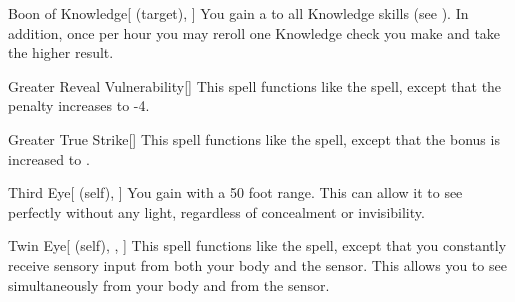 \lowercase{\hypertarget{spell:Boon of Knowledge}{}}\label{spell:Boon of Knowledge}
\begin{attuneability}[Rank 4]{\hypertarget{spell:Boon of Knowledge}{Boon of Knowledge}}[ (target), ]
You gain a   to all Knowledge skills (see ).
In addition, once per hour you may reroll one Knowledge check you make and take the higher result.
\end{attuneability}
\vspace{0.25em}



\lowercase{\hypertarget{spell:Greater Reveal Vulnerability}{}}\label{spell:Greater Reveal Vulnerability}
\begin{freeability}[Rank 4]{\hypertarget{spell:Greater Reveal Vulnerability}{Greater Reveal Vulnerability}}[]
This spell functions like the  spell, except that the penalty increases to -4.
\end{freeability}
\vspace{0.25em}



\lowercase{\hypertarget{spell:Greater True Strike}{}}\label{spell:Greater True Strike}
\begin{freeability}[Rank 4]{\hypertarget{spell:Greater True Strike}{Greater True Strike}}[]
This spell functions like the  spell, except that the bonus is increased to .
\end{freeability}
\vspace{0.25em}



\lowercase{\hypertarget{spell:Third Eye}{}}\label{spell:Third Eye}
\begin{attuneability}[Rank 4]{\hypertarget{spell:Third Eye}{Third Eye}}[ (self), ]
You gain  with a 50 foot range.
This can allow it to see perfectly without any light, regardless of concealment or invisibility.
\end{attuneability}
\vspace{0.25em}



\lowercase{\hypertarget{spell:Twin Eye}{}}\label{spell:Twin Eye}
\begin{attuneability}[Rank 4]{\hypertarget{spell:Twin Eye}{Twin Eye}}[ (self), , ]
This spell functions like the  spell, except that you constantly receive sensory input from both your body and the sensor.
This allows you to see simultaneously from your body and from the sensor.
\end{attuneability}
\vspace{0.25em}



